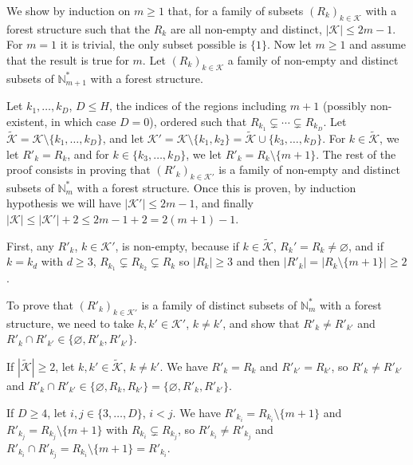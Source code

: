 \documentclass[
  11pt,
  a4paper,
]{article}
\theoremstyle{plain}
\theoremstyle{definition}
\theoremstyle{plain}
\theoremstyle{definition}
\theoremstyle{plain}
\theoremstyle{remark}
\begin{document}
We show by induction on \(m\geq1\) that, for a family of subsets
\((R_k)_{k\in\mathcal{K}}\) with a forest structure such that the
\(R_k\) are all non-empty and distinct, \(|\mathcal{K}|\leq 2m-1\). For
\(m=1\) it is trivial, the only subset possible is \(\{1\}\). Now let
\(m\geq 1\) and assume that the result is true for \(m\). Let
\((R_k)_{k\in\mathcal{K}}\) a family of non-empty and distinct subsets
of \(\mathbb N_{m+1}^*\) with a forest structure.

Let \(k_1, \dotsc, k_D\), \(D\leq H\), the indices of the regions
including \(m+1\) (possibly non-existent, in which case \(D=0\)),
ordered such that \(R_{k_1}\subsetneq\dotsb\subsetneq R_{k_D}\). Let
\(\widetilde{\mathcal{K}}=\mathcal{K}\setminus\{k_1, \dotsc, k_D\}\),
and let
\(\mathcal{K}'=\mathcal{K}\setminus\{k_1, k_2\}=\widetilde{\mathcal{K}}\cup\{k_3, \dotsc, k_D\}\).
For \(k\in \widetilde{\mathcal{K}}\), we let \(R'_k=R_k\), and for
\(k\in\{k_3, \dotsc, k_D\}\), we let \(R'_k=R_k\setminus\{m+1\}\). The
rest of the proof consists in proving that \((R'_k)_{k\in\mathcal{K}'}\)
is a family of non-empty and distinct subsets of \(\mathbb{N}_m^*\) with
a forest structure. Once this is proven, by induction hypothesis we will
have \(|\mathcal{K}'|\leq 2m-1\), and finally
\(|\mathcal{K}|\leq |\mathcal{K}'|+2\leq 2m-1+2=2(m+1)-1\).

First, any \(R'_k\), \(k\in\mathcal{K}'\), is non-empty, because if
\(k\in\widetilde{\mathcal{K}}\), \(R_k'=R_k\neq\varnothing\), and if
\(k=k_d\) with \(d\geq3\), \(R_{k_1}\subsetneq R_{k_2}\subsetneq R_k\)
so \(|R_k|\geq 3\) and then \(|R'_k|=|R_k\setminus\{m+1\}|\geq2\).

To prove that \((R'_k)_{k\in\mathcal{K}'}\) is a family of distinct
subsets of \(\mathbb{N}_m^*\) with a forest structure, we need to take
\(k, k'\in\mathcal{K}'\), \(k\neq k'\), and show that
\(R'_k\neq R'_{k'}\) and
\(R'_k\cap R'_{k'}\in\{\varnothing, R'_k, R'_{k'}\}\).

If \(|\widetilde{\mathcal{K}}|\geq2\), let
\(k, k'\in\widetilde{\mathcal{K}}\), \(k\neq k'\). We have \(R'_k=R_k\)
and \(R'_{k'}=R_{k'}\), so \(R'_k\neq R'_{k'}\) and
\(R'_k\cap R'_{k'}\in\{\varnothing, R_k, R_{k'}\}=\{\varnothing, R'_k, R'_{k'}\}\).

If \(D\geq 4\), let \(i, j\in\{3,\dotsc, D\}\), \(i<j\). We have
\(R'_{k_i}=R_{k_i}\setminus\{m+1\}\) and
\(R'_{k_j}=R_{k_j}\setminus\{m+1\}\) with \(R_{k_i}\subsetneq R_{k_j}\),
so \(R'_{k_i}\neq R'_{k_j}\) and
\(R'_{k_i}\cap R'_{k_j}=R_{k_i}\setminus\{m+1\}=R'_{k_i}\).
\end{document}
